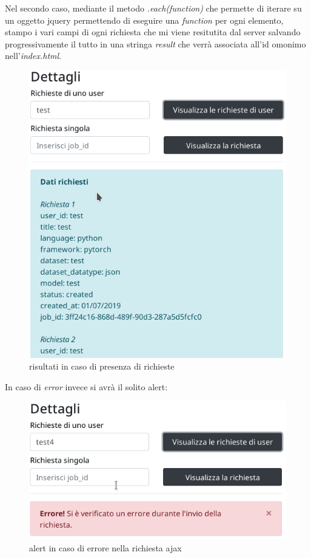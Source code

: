 \documentclass[a4paper,12pt, oneside]{book}
\begin{document}
Nel secondo caso,
mediante il metodo \textit{.each(function)} che permette di iterare su un oggetto
jquery permettendo di eseguire una \textit{function} per ogni elemento, stampo i
vari campi di ogni richiesta che mi viene resitutita dal server salvando progressivamente il tutto in una stringa \textit{result} che verrà associata all'id omonimo nell'\textit{index.html}. \\
\begin{figure}[H]
  \centering
  \includegraphics[scale = 0.43]{img/good-user.png}
  \caption{risultati in caso di presenza di richieste}
\end{figure}
In caso di \textit{error} invece si avrà il solito alert:
\begin{figure}[H]
  \centering
  \includegraphics[scale = 0.7]{img/bad-user-query.png}
  \caption{alert in caso di errore nella richiesta ajax}
\end{figure}
\end{document}
